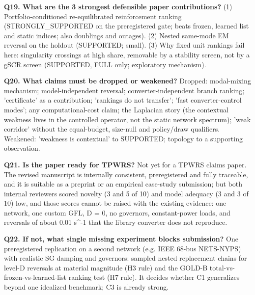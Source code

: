 \documentclass[10pt,a4paper]{article}
\begin{document}
\textbf{Q19. What are the 3 strongest defensible paper contributions?} (1) Portfolio-conditioned re-equilibrated reinforcement ranking (STRONGLY\_SUPPORTED on the preregistered gate; beats frozen, learned list and static indices; also doublings and outages). (2) Nested same-mode EM reversal on the holdout (SUPPORTED; small). (3) Why fixed unit rankings fail here: singularity crossings at high share, removable by a stability screen, not by a gSCR screen (SUPPORTED, FULL only; exploratory mechanism).

\textbf{Q20. What claims must be dropped or weakened?} Dropped: modal-mixing mechanism; model-independent reversal; converter-independent branch ranking; 'certificate' as a contribution; 'rankings do not transfer'; 'fast converter-control modes'; any computational-cost claim; the Laplacian story (the contextual weakness lives in the controlled operator, not the static network spectrum); 'weak corridor' without the equal-budget, size-null and policy/draw qualifiers. Weakened: 'weakness is contextual' to SUPPORTED; topology to a supporting observation.

\textbf{Q21. Is the paper ready for TPWRS?} Not yet for a TPWRS claims paper. The revised manuscript is internally consistent, preregistered and fully traceable, and it is suitable as a preprint or an empirical case-study submission; but both internal reviewers scored novelty (3 and 5 of 10) and model adequacy (3 and 3 of 10) low, and those scores cannot be raised with the existing evidence: one network, one custom GFL, D = 0, no governors, constant-power loads, and reversals of about 0.01 s\textasciicircum{}-1 that the library converter does not reproduce.

\textbf{Q22. If not, what single missing experiment blocks submission?} One preregistered replication on a second network (e.g. IEEE 68-bus NETS-NYPS) with realistic SG damping and governors: sampled nested replacement chains for level-D reversals at material magnitude (H3 rule) and the GOLD-B total-vs-frozen-vs-learned-list ranking test (H7 rule). It decides whether C1 generalizes beyond one idealized benchmark; C3 is already strong.
\end{document}
